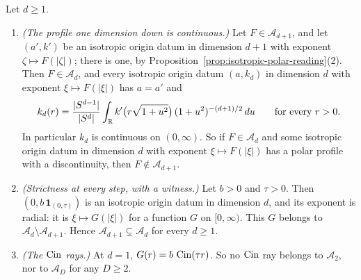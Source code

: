 \begin{proposition}\label{prop:profile-one-dimension-down}
Let $d \ge 1$.
\begin{enumerate}
\item \emph{(The profile one dimension down is continuous.)} Let $F \in \mathcal{A}_{d+1}$, and
let $(a',k')$ be an isotropic origin datum in dimension $d + 1$ with exponent
$\zeta \mapsto F(|\zeta|)$; there is one, by Proposition~\ref{prop:isotropic-polar-reading}(2). Then
$F \in \mathcal{A}_d$, and every isotropic origin datum
$(a,k_d)$ in dimension $d$ with exponent $\xi \mapsto F(|\xi|)$ has $a = a'$ and
\[
  k_d(r) = \frac{|S^{d-1}|}{|S^{d}|}\int_{\mathbb{R}} k'\bigl(r\sqrt{1+u^2}\bigr)\,(1+u^2)^{-(d+1)/2}\,du
  \qquad\text{for every } r > 0 .
\]
In particular $k_d$ is continuous on $(0,\infty)$. So if $F \in \mathcal{A}_d$ and some isotropic
origin datum in dimension $d$ with exponent $\xi \mapsto F(|\xi|)$ has a polar profile with a
discontinuity, then $F \notin \mathcal{A}_{d+1}$.
\item \emph{(Strictness at every step, with a witness.)} Let $b > 0$ and $\tau > 0$. Then
$(0, b\,\mathbf 1_{(0,\tau)})$ is an isotropic origin datum in dimension $d$, and its exponent is
radial: it is $\xi \mapsto G(|\xi|)$ for a function $G$ on $[0,\infty)$. This $G$ belongs to
$\mathcal{A}_d \setminus \mathcal{A}_{d+1}$. Hence $\mathcal{A}_{d+1} \subsetneq \mathcal{A}_d$
for every $d \ge 1$.
\item \emph{(The $\operatorname{Cin}$ rays.)} At $d = 1$, $G(r) = b\,\operatorname{Cin}(\tau r)$. So no $\operatorname{Cin}$ ray belongs
to $\mathcal{A}_2$, nor to $\mathcal{A}_D$ for any $D \ge 2$.
\end{enumerate}
\end{proposition}

